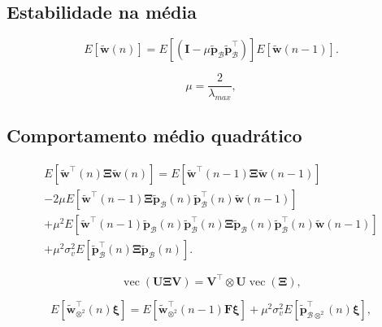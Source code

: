 \subsection{Estabilidade na média}

\begin{equation}
    E\left[\tilde{\mathbf{w}}(n)\right] = E\left[ \left(\mathbf{I} - \mu \tilde{\mathbf{p}}_{\mathcal{B}}\tilde{\mathbf{p}}^\top_{\mathcal{B}} \right) \right] E\left[\tilde{\mathbf{w}}(n-1)\right].
\end{equation}

\begin{equation}
    \mu = \frac{2}{\lambda_{max}},
\end{equation}

\subsection{Comportamento médio quadrático}

\begin{multline}
    E\left[ \tilde{\mathbf{w}}^\top(n)\boldsymbol{\Xi}\tilde{\mathbf{w}}(n)\right] = E\left[ \tilde{\mathbf{w}}^\top(n-1)\boldsymbol{\Xi}\tilde{\mathbf{w}}(n-1) \right]\\
    - 2\mu E\left[ \tilde{\mathbf{w}}^\top(n-1)\boldsymbol{\Xi}\tilde{\mathbf{p}}_{\mathcal{B}}(n)\tilde{\mathbf{p}}_{\mathcal{B}}^\top(n)\tilde{\mathbf{w}}(n-1) \right]\\
    +\mu^2 E\left[\tilde{\mathbf{w}}^{\top}(n-1)\tilde{\mathbf{p}}_{\mathcal{B}}(n)\tilde{\mathbf{p}}^\top_{\mathcal{B}}(n)\boldsymbol{\Xi}\tilde{\mathbf{p}}_{\mathcal{B}}(n)\tilde{\mathbf{p}}_{\mathcal{B}}^\top(n)\tilde{\mathbf{w}}(n-1)\right]\\
    +\mu^2 \sigma_{v}^2E\left[ \tilde{\mathbf{p}}^\top_{\mathcal{B}}(n)\boldsymbol{\Xi}\tilde{\mathbf{p}}_{\mathcal{B}}(n) \right].\label{eq:EwSw}
\end{multline}

\begin{equation*}
    \operatorname{vec}\left(\mathbf{U}\boldsymbol{\Xi}\mathbf{V}\right) = \mathbf{V}^\top\otimes\mathbf{U}\operatorname{vec}\left(\boldsymbol{\Xi}\right),
\end{equation*}

\begin{equation}
    E\left[ \tilde{\mathbf{w}}^\top_{\otimes^2}(n) \boldsymbol{\xi}\right] = E\left[ \tilde{\mathbf{w}}^\top_{\otimes^2}(n-1) \mathbf{F}\boldsymbol{\xi}\right] +\mu^2 \sigma_{v}^2E\left[ \tilde{\mathbf{p}}^\top_{\mathcal{B}\otimes^2}(n)\boldsymbol{\xi} \right],\label{eq:Ewkron2}
\end{equation}

